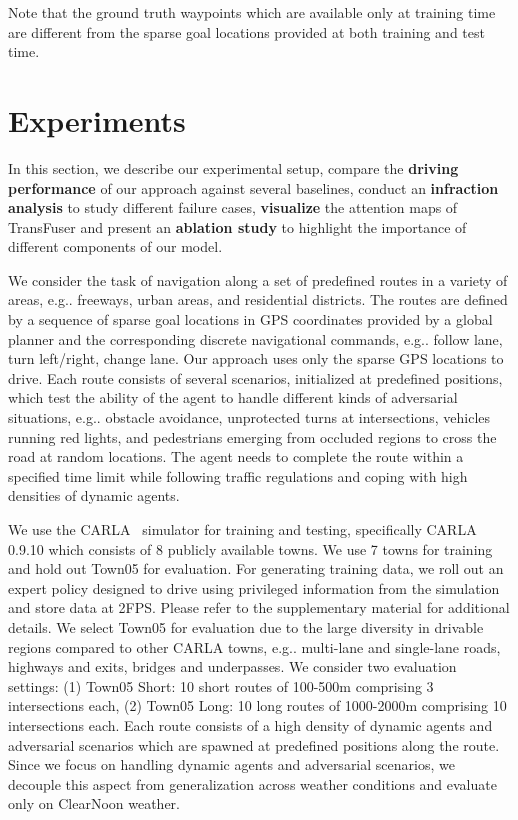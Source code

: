 \documentclass[final]{cvpr}
\makeatletter
\DeclareRobustCommand\onedot{\futurelet\@let@token\@onedot}
\def\@onedot{\ifx\@let@token.\else.\null\fi\xspace}
\def\eg{e.g\onedot} \def\Eg{E.g\onedot}
\newcommand{\boldparagraph}[1]{\vspace{0.1cm}\noindent{\bf #1:}}
\makeatother
\begin{document}
Note that the ground truth waypoints  which are available only at training time are different from the sparse goal locations  provided at both training and test time.
 \section{Experiments}
\label{sec:results}

In this section, we describe our experimental setup, compare the \textbf{driving performance} of our approach against several baselines, conduct an \textbf{infraction analysis} to study different failure cases, \textbf{visualize} the attention maps of TransFuser and present an \textbf{ablation study} to highlight the importance of different components of our model.

\boldparagraph{Task} \label{sec:task} We consider the task of navigation along a set of predefined routes in a variety of areas, \eg freeways, urban areas, and residential districts. The routes are defined by a sequence of sparse goal locations in GPS coordinates provided by a global planner and the corresponding discrete navigational commands, \eg follow lane, turn left/right, change lane. Our approach uses only the sparse GPS locations to drive. Each route consists of several scenarios, initialized at predefined positions, which test the ability of the agent to handle different kinds of adversarial situations, \eg obstacle avoidance, unprotected turns at intersections, vehicles running red lights, and pedestrians emerging from occluded regions to cross the road at random locations. The agent needs to complete the route within a specified time limit while following traffic regulations and coping with high densities of dynamic agents.

\boldparagraph{Dataset} We use the CARLA~\cite{Dosovitskiy2017CORL} simulator for training and testing, specifically CARLA 0.9.10 which consists of 8 publicly available towns. We use 7 towns for training and hold out Town05 for evaluation. For generating training data, we roll out an expert policy designed to drive using privileged information from the simulation and store data at 2FPS. Please refer to the supplementary material for additional details.
We select Town05 for evaluation due to the large diversity in drivable regions compared to other CARLA towns, \eg multi-lane and single-lane roads, highways and exits, bridges and underpasses. We consider two evaluation settings: (1) Town05 Short: 10 short routes of 100-500m comprising 3 intersections each, (2) Town05 Long: 10 long routes of 1000-2000m comprising 10 intersections each. Each route consists of a high density of dynamic agents and adversarial scenarios which are spawned at predefined positions along the route. Since we focus on handling dynamic agents and adversarial scenarios, we decouple this aspect from generalization across weather conditions and evaluate only on ClearNoon weather.
\end{document}
